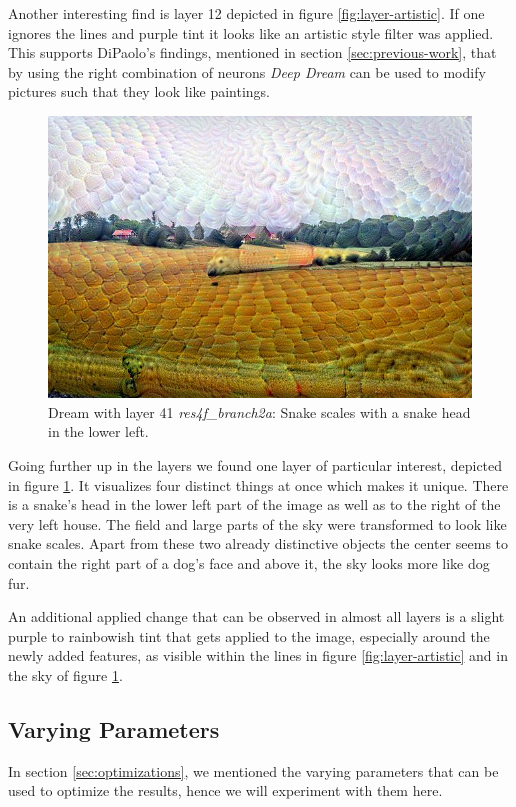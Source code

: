 Another interesting find is layer 12 depicted in figure \ref{fig:layer-artistic}.
If one ignores the lines and purple tint it looks like an artistic style filter was applied.
This supports DiPaolo's findings, mentioned in section \ref{sec:previous-work}, that by using the right combination of neurons \textit{Deep Dream} can be used to modify pictures such that they look like paintings.

\begin{figure}[H]
	\centering
	\includegraphics[width=0.7\linewidth]{img/alpsted-landscape_res4f_branch2a.jpg}
	\caption{Dream with layer 41 \emph{res4f\_branch2a}: Snake scales with a snake head in the lower left.}
	\label{fig:layer-snake}
\end{figure}

Going further up in the layers we found one layer of particular interest, depicted in figure \ref{fig:layer-snake}.
It visualizes four distinct things at once which makes it unique.
There is a snake's head in the lower left part of the image as well as to the right of the very left house.
The field and large parts of the sky were transformed to look like snake scales.
Apart from these two already distinctive objects the center seems to contain the right part of a dog's face and above it, the sky looks more like dog fur.

An additional applied change that can be observed in almost all layers is a slight purple to rainbowish tint that gets applied to the image, especially around the newly added features, as visible within the lines in figure \ref{fig:layer-artistic} and in the sky of figure \ref{fig:layer-snake}.




\subsection{Varying Parameters}
\label{sec:varying-parameters}
In section \ref{sec:optimizations}, we mentioned the varying parameters that can be used to optimize the results, hence we will experiment with them here.

